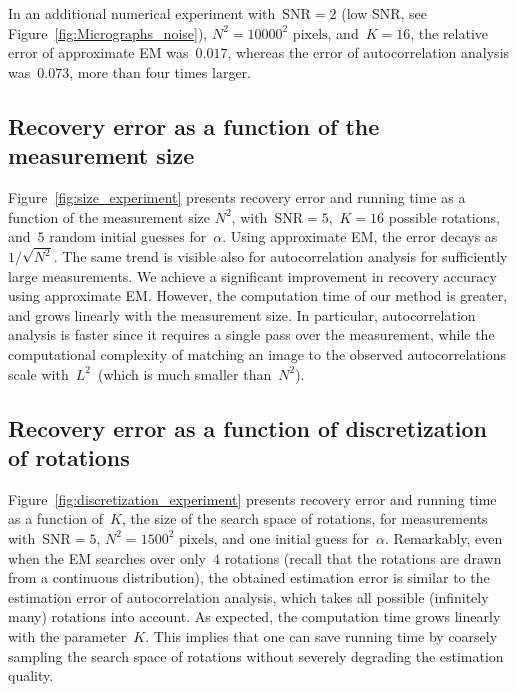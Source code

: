 \documentclass{article}
\begin{document}
In an additional numerical experiment with~$\text{SNR} = 2$ (low SNR, see Figure~\ref{fig:Micrographs_noise}), $N^2 = 10000^2 \text{ pixels}$, and~\mbox{$K = 16$}, the relative error of approximate EM was~$\text{0.017}$, whereas the error of autocorrelation analysis was~$0.073$, more than four times larger.

\subsection{Recovery error as a function of the measurement size}
\label{subsec:exp_size}
Figure~\ref{fig:size_experiment} presents recovery error and running time as a function of the measurement size $N^2$, with~\mbox{$\text{SNR} = 5$},~\mbox{$K = 16$} possible rotations, and~$5$ random initial guesses for~$\alpha$. Using approximate EM, the error decays \mbox{as~$1 / \sqrt{N^2}$}. The same trend is visible also for autocorrelation analysis for sufficiently large measurements. We achieve a significant improvement in recovery accuracy using approximate EM. However, the computation time of our method is greater, and grows linearly with the measurement size. In particular, autocorrelation analysis is faster since it requires a single pass over the measurement, while the computational complexity of matching an image to the observed autocorrelations scale with~$L^2$~(which is much smaller than~$N^2$).

\subsection{Recovery error as a function of discretization of rotations}
\label{subsec:exp_discretization}
Figure~\ref{fig:discretization_experiment} presents recovery error and running time as a function of~$K$, the size of the search space of rotations, for measurements with~\mbox{$\text{SNR} = 5$}, $N^2 = 1500^2 \text{ pixels}$, and one  initial guess for~$\alpha$. Remarkably, even when the EM searches over only~$4$ rotations (recall that the rotations are drawn from a continuous distribution), the obtained estimation error is similar to the estimation error of autocorrelation analysis, which takes all possible (infinitely many) rotations into account. As expected, the computation time grows linearly with the parameter~$K$. This implies that one can save running time by coarsely sampling  the search space of rotations without severely degrading  the estimation quality.
\end{document}
